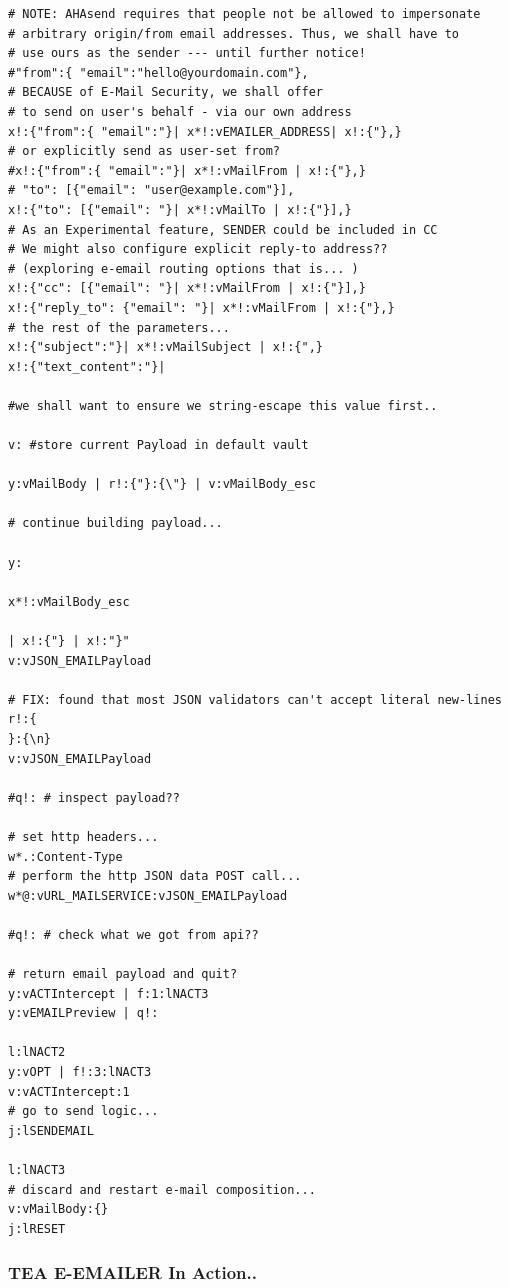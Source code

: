 \documentclass[a4paper, 18pt]{book} %
\begin{document}
{{{{\begin{tcolorbox}[teaterminalstyle, title=TEA Program: E-MAILER v1.6, breakable]
\begin{lstlisting}[language=TEA,breaklines=true,]
# NOTE: AHAsend requires that people not be allowed to impersonate
# arbitrary origin/from email addresses. Thus, we shall have to 
# use ours as the sender --- until further notice!
#"from":{ "email":"hello@yourdomain.com"},
# BECAUSE of E-Mail Security, we shall offer
# to send on user's behalf - via our own address
x!:{"from":{ "email":"}| x*!:vEMAILER_ADDRESS| x!:{"},}
# or explicitly send as user-set from?
#x!:{"from":{ "email":"}| x*!:vMailFrom | x!:{"},}
# "to": [{"email": "user@example.com"}],
x!:{"to": [{"email": "}| x*!:vMailTo | x!:{"}],}
# As an Experimental feature, SENDER could be included in CC
# We might also configure explicit reply-to address??
# (exploring e-email routing options that is... )
x!:{"cc": [{"email": "}| x*!:vMailFrom | x!:{"}],}
x!:{"reply_to": {"email": "}| x*!:vMailFrom | x!:{"},}
# the rest of the parameters...
x!:{"subject":"}| x*!:vMailSubject | x!:{",}
x!:{"text_content":"}|

#we shall want to ensure we string-escape this value first..

v: #store current Payload in default vault

y:vMailBody | r!:{"}:{\"} | v:vMailBody_esc

# continue building payload...

y:

x*!:vMailBody_esc 

| x!:{"} | x!:"}"
v:vJSON_EMAILPayload

# FIX: found that most JSON validators can't accept literal new-lines
r!:{
}:{\n}
v:vJSON_EMAILPayload

#q!: # inspect payload??

# set http headers...
w*.:Content-Type
# perform the http JSON data POST call...
w*@:vURL_MAILSERVICE:vJSON_EMAILPayload

#q!: # check what we got from api??

# return email payload and quit?
y:vACTIntercept | f:1:lNACT3
y:vEMAILPreview | q!:

l:lNACT2
y:vOPT | f!:3:lNACT3
v:vACTIntercept:1
# go to send logic...
j:lSENDEMAIL

l:lNACT3
# discard and restart e-mail composition...
v:vMailBody:{}
j:lRESET
   \end{lstlisting}
  \end{tcolorbox}
  \caption{TEA APPLICATION: E-MAILER v1.6 --- a simple and special E-Mail sending client written using the TEA language}
  \label{FIGWAPP1}
}


\subsubsection{TEA E-EMAILER In Action..}

}}}
\end{document}

